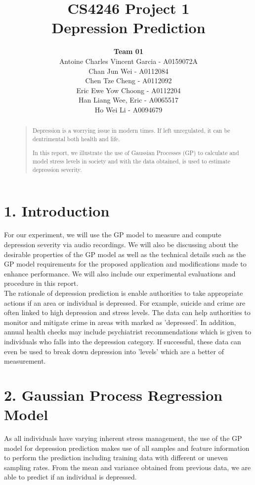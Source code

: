 \documentclass{article}
\title{
	CS4246 Project 1\\ Depression Prediction
}
\author{
	{\bf Team 01} \\
	Antoine Charles Vincent Garcia - A0159072A\\
	Chan Jun Wei - A0112084\\
	Chen Tze Cheng - A0112092\\
	Eric Ewe Yow Choong - A0112204\\
	Han Liang Wee, Eric - A0065517\\
	Ho Wei Li - A0094679\\
}
\begin{document}
 	\maketitle

	\begin{abstract}
	\begin{quote}
	Depression is a worrying issue in modern times. If left unregulated, it can be dentrimental both health and life.
	
	In this report, we illustrate the use of Gaussian Processes (GP) to calculate and model stress levels in society and with the data obtained, is used to estimate depression severity. \\
	\end{quote}
	\end{abstract}
	
	\section{1.	  Introduction}
	For our experiment, we will use the GP model to measure and compute depression severity via audio recordings. We will also be discussing about the desirable properties of the GP model as well as the technical details such as the GP model requirements for the proposed application and modifications made to enhance performance. We will also include our experimental evaluations and procedure in this report.\\

	The rationale of depression prediction is enable authorities to take appropriate actions if an area or individual is depressed. For example, suicide and crime are often linked to high depression and stress levels. The data can help authorities to monitor and mitigate crime in areas with marked as 'depressed'. In addition, annual health checks may include psychiatrist recommendations which is given to individuals who falls into the depression category. If successful, these data can even be used to break down depression into 'levels' which are a better of measurement. \\

	\section{2.  Gaussian Process Regression Model}
	As all individuals have varying inherent stress management, the use of the GP model for depression prediction makes use of all samples and feature information to perform the prediction including training data with different or uneven sampling rates. From the mean and variance obtained from previous data, we are able to predict if an individual is depressed. \\	
\end{document}
